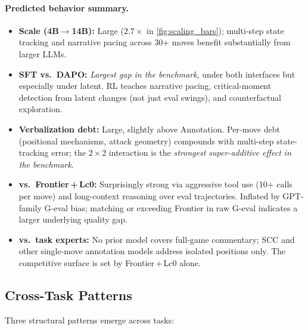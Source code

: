 \paragraph{Predicted behavior summary.}
\begin{itemize}[leftmargin=*, itemsep=2pt, topsep=2pt]
\item \textbf{Scale (4B${\to}$14B):} Large ($2.7{\times}$ in
  \cref{fig:scaling_bars}); multi-step state tracking and narrative
  pacing across 30+ moves benefit substantially from larger LLMs.
\item \textbf{SFT vs.\ DAPO:} \emph{Largest gap in the benchmark}, under
  both interfaces but especially under latent.
  RL teaches narrative pacing, critical-moment detection from latent
  changes (not just eval swings), and counterfactual exploration.
\item \textbf{Verbalization debt:} Large, slightly above Annotation.
  Per-move debt (positional mechanisms, attack geometry) compounds
  with multi-step state-tracking error; the $2{\times}2$ interaction
  is the \emph{strongest super-additive effect in the benchmark}.
\item \textbf{vs.\ Frontier\,+\,Lc0:} Surprisingly strong via aggressive
  tool use (10+ calls per move) and long-context reasoning over eval
  trajectories.
  Inflated by GPT-family G-eval bias; matching or exceeding Frontier
  in raw G-eval indicates a larger underlying quality gap.
\item \textbf{vs.\ task experts:} No prior model covers full-game
  commentary; SCC and other single-move annotation models address
  isolated positions only.
  The competitive surface is set by Frontier\,+\,Lc0 alone.
\end{itemize}

\subsection{Cross-Task Patterns}
\label{sec:app_landscape_cross}

Three structural patterns emerge across tasks:

